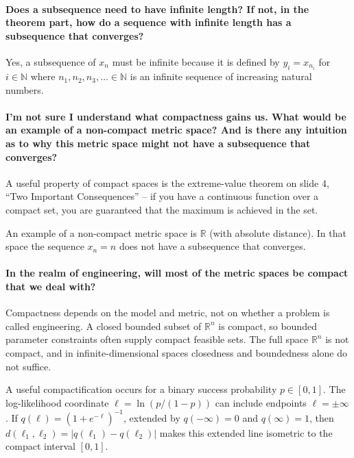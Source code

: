 \documentclass[10pt,english]{article}
\begin{document}
\paragraph{Does a subsequence need to have infinite length? If not, in the theorem part, how do a sequence with infinite length has a subsequence that converges?}
Yes, a subsequence of $x_n$ must be infinite because it is defined by  $y_i = x_{n_i}$ for $i\in \mathbb{N}$ where $n_1 , n_2 , n_3, \ldots \in \mathbb{N}$ is an infinite sequence of increasing natural numbers.


\paragraph{I'm not sure I understand what compactness gains us. What would be an example of a non-compact metric space? And is there any intuition as to why this metric space might not have a subsequence that converges?}
A useful property of compact spaces is the extreme-value theorem on slide 4, ``Two Important Consequences'' -- if you have a continuous function over a compact set, you are guaranteed that the maximum is achieved in the set.

An example of a non-compact metric space is $\mathbb{R}$ (with absolute distance).
In that space the sequence $x_n = n$ does not have a subsequence that converges.


\paragraph{In the realm of engineering, will most of the metric spaces be compact that we deal with?}


Compactness depends on the model and metric, not on whether a problem is called engineering.
A closed bounded subset of $\mathbb{R}^n$ is compact, so bounded parameter constraints often supply compact feasible sets.
The full space $\mathbb{R}^n$ is not compact, and in infinite-dimensional spaces closedness and boundedness alone do not suffice.

A useful compactification occurs for a binary success probability $p\in[0,1]$.
The log-likelihood coordinate $\ell=\ln(p/(1-p))$ can include endpoints $\ell=\pm\infty$.
If $q(\ell)=(1+e^{-\ell})^{-1}$, extended by $q(-\infty)=0$ and $q(\infty)=1$, then $d(\ell_1,\ell_2)=|q(\ell_1)-q(\ell_2)|$ makes this extended line isometric to the compact interval $[0,1]$.
\end{document}
